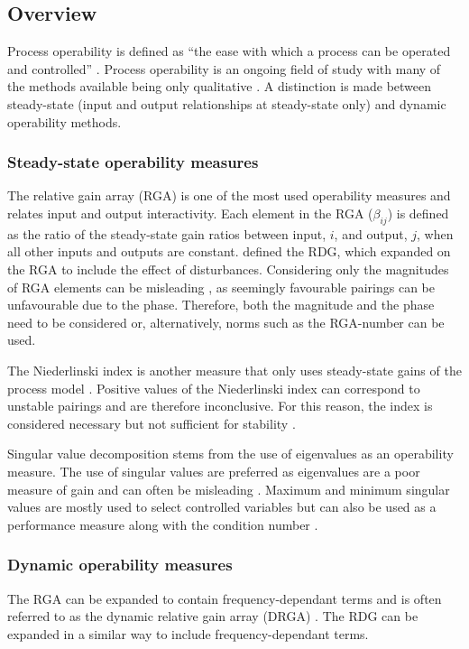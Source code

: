\subsection{Overview}
Process operability is defined as ``the ease with which a process can be operated and controlled'' \citep[778]{marlin}.
Process operability is an ongoing field of study with many of the methods available being only qualitative \citep[164]{skogestad}. 
A distinction is made between steady-state (input and output relationships at steady-state only) and dynamic operability methods.

\subsubsection{Steady-state operability measures}
The relative gain array (RGA) is one of the most used operability measures \citep[576]{luyben} and relates input and output interactivity.
Each element in the RGA ($\beta_{ij}$) is defined as the ratio of the steady-state gain ratios between input, $i$, and output, $j$, when all other inputs and outputs are constant.
\citet{artrdg} defined the RDG, which expanded on the RGA to include the effect of disturbances. 
Considering only the magnitudes of RGA elements can be misleading \citep[87]{skogestad}, as seemingly favourable pairings can be unfavourable due to the phase.
Therefore, both the magnitude and the phase need to be considered or, alternatively, norms such as the RGA-number can be used.


The Niederlinski index is another measure that only uses steady-state gains of the process model \citep[572-573]{luyben}.
Positive values of the Niederlinski index can correspond to unstable pairings and are therefore inconclusive.
For this reason, the index is considered necessary but not sufficient for stability \citep[445]{skogestad}.

Singular value decomposition stems from the use of eigenvalues as an operability measure. 
The use of singular values are preferred as eigenvalues are a poor
measure of gain and can often be misleading \citep[75]{skogestad}.
Maximum and minimum singular values are mostly used to select controlled variables but can also be used as a performance measure along with the condition number .

\subsubsection{Dynamic operability measures}
The RGA can be expanded to contain frequency-dependant terms and is often referred to as the dynamic relative gain array (DRGA) \citep[637]{marlin}. 
The RDG \citep{artrdg} can be expanded in a similar way to include frequency-dependant terms.

